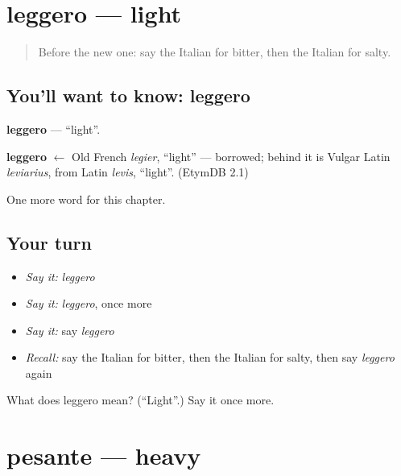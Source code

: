 \section[leggero]{leggero — light}

\label{lesson:IT-C130-leggero}



\begin{quote}
Before the new one: say the Italian for bitter, then the Italian for salty.
\end{quote}

\subsection*{You'll want to know: leggero}
\textbf{leggero} — \textquotedblleft{}light\textquotedblright{}.

\begin{cousinweb}
\textbf{leggero} $\leftarrow$ Old French \emph{legier}, \textquotedblleft{}light\textquotedblright{} — borrowed; behind it is Vulgar Latin \emph{leviarius}, from Latin \emph{levis}, \textquotedblleft{}light\textquotedblright{}. (EtymDB 2.1)
\end{cousinweb}

\begin{grammarlens}[title={What you've built}]
One more word for this chapter.
\end{grammarlens}

\subsection*{Your turn}
\begin{itemize}
\raggedright
  \item \emph{Say it:} \emph{leggero}
  \item \emph{Say it:} \emph{leggero}, once more
  \item \emph{Say it:} say \emph{leggero}
  \item \emph{Recall:} say the Italian for bitter, then the Italian for salty, then say \emph{leggero} again
\end{itemize}

\begin{tcolorbox}[breakable,colback=teal!4,colframe=teal!35!black,title={Before you move on}]
What does leggero mean? (\textquotedblleft{}Light\textquotedblright{}.) Say it once more.
\end{tcolorbox}
\section[pesante]{pesante — heavy}

